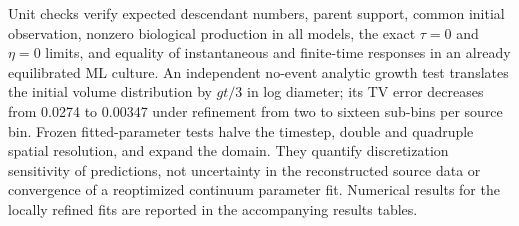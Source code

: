 Unit checks verify expected descendant numbers, parent support, common initial observation, nonzero biological production in all models, the exact $\tau=0$ and $\eta=0$ limits, and equality of instantaneous and finite-time responses in an already equilibrated ML culture. An independent no-event analytic growth test translates the initial volume distribution by $gt/3$ in log diameter; its TV error decreases from 0.0274 to 0.00347 under refinement from two to sixteen sub-bins per source bin. Frozen fitted-parameter tests halve the timestep, double and quadruple spatial resolution, and expand the domain. They quantify discretization sensitivity of predictions, not uncertainty in the reconstructed source data or convergence of a reoptimized continuum parameter fit. Numerical results for the locally refined fits are reported in the accompanying results tables.



